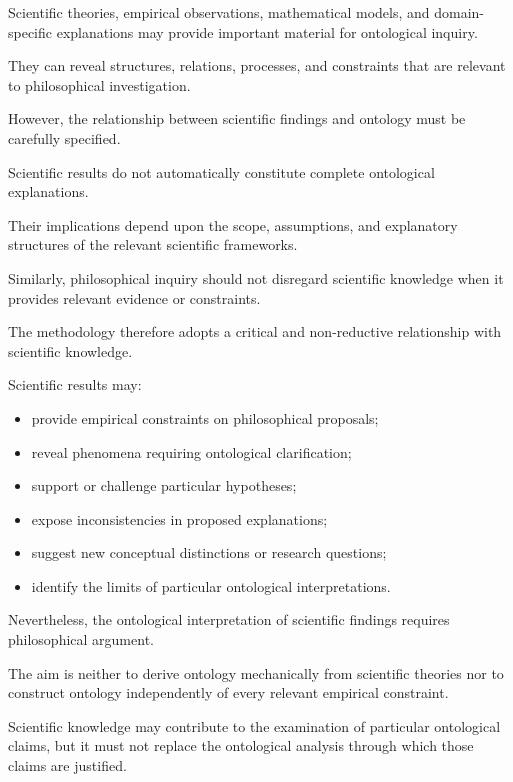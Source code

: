 Scientific theories, empirical
observations, mathematical models,
and domain-specific explanations
may provide important material
for ontological inquiry.

They can reveal structures,
relations, processes, and
constraints that are relevant
to philosophical investigation.

However, the relationship between
scientific findings and ontology
must be carefully specified.

Scientific results do not
automatically constitute complete
ontological explanations.

Their implications depend upon
the scope, assumptions, and
explanatory structures of the
relevant scientific frameworks.

Similarly, philosophical inquiry
should not disregard scientific
knowledge when it provides
relevant evidence or constraints.

The methodology therefore adopts
a critical and non-reductive
relationship with scientific
knowledge.

Scientific results may:

\begin{itemize}

    \item provide empirical constraints
    on philosophical proposals;

    \item reveal phenomena requiring
    ontological clarification;

    \item support or challenge
    particular hypotheses;

    \item expose inconsistencies
    in proposed explanations;

    \item suggest new conceptual
    distinctions or research
    questions;

    \item identify the limits
    of particular ontological
    interpretations.

\end{itemize}

Nevertheless, the ontological
interpretation of scientific
findings requires philosophical
argument.

The aim is neither to derive
ontology mechanically from
scientific theories nor to
construct ontology independently
of every relevant empirical
constraint.

Scientific knowledge may
contribute to the examination
of particular ontological claims,
but it must not replace the
ontological analysis through
which those claims are justified.

